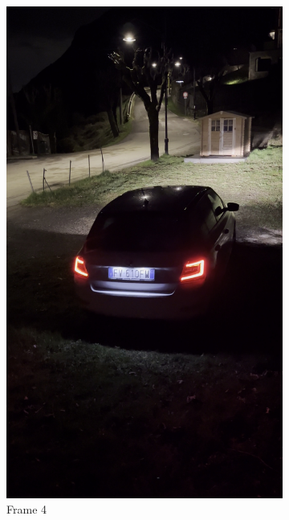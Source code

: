\begin{figure}[h!]
\begin{subfigure}[b]{0.24\textwidth}
        \includegraphics[width=\textwidth]{Images/featureExtractions/frame04.jpg}
        \caption{Frame 4}
    \end{subfigure}
    \begin{subfigure}[b]{0.24\textwidth}

\end{subfigure}
\end{figure}
